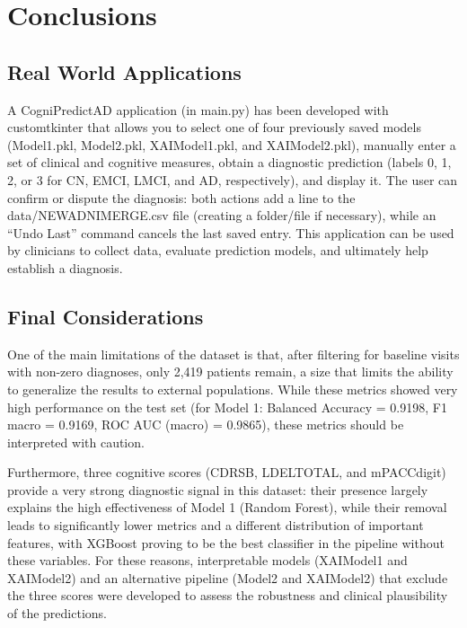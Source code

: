 \section{Conclusions}
\subsection{Real World Applications}
A CogniPredictAD application (in main.py) has been developed with customtkinter that allows you to select one of four previously saved models (Model1.pkl, Model2.pkl, XAIModel1.pkl, and XAIModel2.pkl), manually enter a set of clinical and cognitive measures, obtain a diagnostic prediction (labels 0, 1, 2, or 3 for CN, EMCI, LMCI, and AD, respectively), and display it. The user can confirm or dispute the diagnosis: both actions add a line to the data/NEWADNIMERGE.csv file (creating a folder/file if necessary), while an “Undo Last” command cancels the last saved entry. This application can be used by clinicians to collect data, evaluate prediction models, and ultimately help establish a diagnosis.

\subsection{Final Considerations}
One of the main limitations of the dataset is that, after filtering for baseline visits with non-zero diagnoses, only 2,419 patients remain, a size that limits the ability to generalize the results to external populations. While these metrics showed very high performance on the test set (for Model 1: Balanced Accuracy = 0.9198, F1 macro = 0.9169, ROC AUC (macro) = 0.9865), these metrics should be interpreted with caution.

\vspace{2mm}

Furthermore, three cognitive scores (CDRSB, LDELTOTAL, and mPACCdigit) provide a very strong diagnostic signal in this dataset: their presence largely explains the high effectiveness of Model 1 (Random Forest), while their removal leads to significantly lower metrics and a different distribution of important features, with XGBoost proving to be the best classifier in the pipeline without these variables. For these reasons, interpretable models (XAIModel1 and XAIModel2) and an alternative pipeline (Model2 and XAIModel2) that exclude the three scores were developed to assess the robustness and clinical plausibility of the predictions.

\vspace{2mm}

